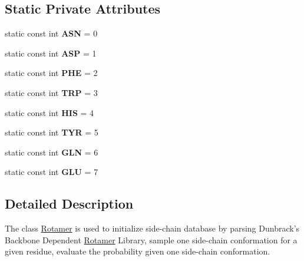 \subsection*{Static Private Attributes}
\begin{DoxyCompactItemize}
\item 
\hypertarget{classRotamer_a74531505f22df04f9cc8f6f1a9446b43}{static const int {\bfseries A\-S\-N} = 0}\label{classRotamer_a74531505f22df04f9cc8f6f1a9446b43}

\item 
\hypertarget{classRotamer_ab4e8dc3cd5bb7af8b9034b60551107cd}{static const int {\bfseries A\-S\-P} = 1}\label{classRotamer_ab4e8dc3cd5bb7af8b9034b60551107cd}

\item 
\hypertarget{classRotamer_aa4134daf455c87b5125a09a92557150b}{static const int {\bfseries P\-H\-E} = 2}\label{classRotamer_aa4134daf455c87b5125a09a92557150b}

\item 
\hypertarget{classRotamer_a81006b4b69528bde0da59807cd8337d8}{static const int {\bfseries T\-R\-P} = 3}\label{classRotamer_a81006b4b69528bde0da59807cd8337d8}

\item 
\hypertarget{classRotamer_a8182f9506799c4804996fcaab1998e3e}{static const int {\bfseries H\-I\-S} = 4}\label{classRotamer_a8182f9506799c4804996fcaab1998e3e}

\item 
\hypertarget{classRotamer_a34e69bdbf3bb7e75514cbca1382dd783}{static const int {\bfseries T\-Y\-R} = 5}\label{classRotamer_a34e69bdbf3bb7e75514cbca1382dd783}

\item 
\hypertarget{classRotamer_ab6344892c9b56fae3485b98c88f569f3}{static const int {\bfseries G\-L\-N} = 6}\label{classRotamer_ab6344892c9b56fae3485b98c88f569f3}

\item 
\hypertarget{classRotamer_aec53b6e0a7f4e5bba337eb8ba3239132}{static const int {\bfseries G\-L\-U} = 7}\label{classRotamer_aec53b6e0a7f4e5bba337eb8ba3239132}

\end{DoxyCompactItemize}


\subsection{Detailed Description}
The class \hyperlink{classRotamer}{Rotamer} is used to initialize side-\/chain database by parsing Dunbrack's Backbone Dependent \hyperlink{classRotamer}{Rotamer} Library, sample one side-\/chain conformation for a given residue, evaluate the probability given one side-\/chain conformation. 

